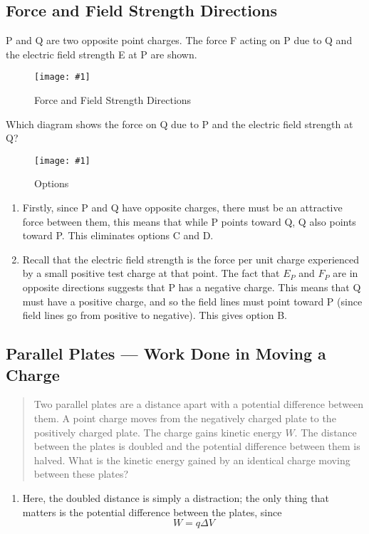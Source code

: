 \documentclass[a4paper,12pt]{article}
\newcommand{\img}[4]{\begin{center}
  \begin{figure}[H]
    \centering
    \texttt{[image: \#1]}
    \caption{#3}
    \label{fig:#4}
  \end{figure}
\end{center}}
\begin{document}
\subsection{Force and Field Strength Directions}

P and Q are two opposite point charges. The force F acting on P due to Q and the electric field strength E at P are shown.
\img{ex/estrengthdirection.png}{0.5}{Force and Field Strength Directions}{estrengthdirection}
Which diagram shows the force on Q due to P and the electric field strength at Q?
\img{ex/estrengthdirection_options.png}{0.8}{Options}{estrengthdirection}

\begin{enumerate}
  \item Firstly, since P and Q have opposite charges, there must be an attractive force between them, this means that while P points toward Q, Q also points toward P. This eliminates options C and D.
  \item Recall that the electric field strength is the force per unit charge experienced by a small positive test charge at that point. The fact that $E_P$ and $F_P$ are in opposite directions suggests that P has a negative charge. This means that Q must have a positive charge, and so the field lines must point toward P (since field lines go from positive to negative). This gives option B.
\end{enumerate}

\pagebreak
\subsection{Parallel Plates --- Work Done in Moving a Charge}

\begin{quote}
  Two parallel plates are a distance apart with a potential difference between them. A point charge moves from the negatively charged plate to the positively charged plate. The charge gains kinetic energy $W$. The distance between the plates is doubled and the potential difference between them is halved. What is the kinetic energy gained by an identical charge moving between these plates?
\end{quote}
\begin{enumerate}
  \item Here, the doubled distance is simply a distraction; the only thing that matters is the potential difference between the plates, since $$W = q\Delta V$$
\end{enumerate}
\end{document}
